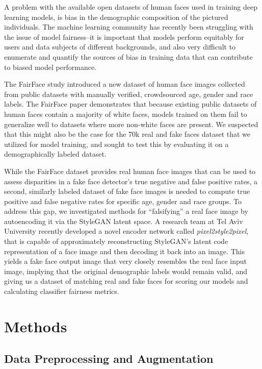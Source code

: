 \documentclass[11pt, letterpaper]{article}
\begin{document}
\begin{multicols}{2}
  A problem with the available open datasets of human faces used in
  training deep learning models, is bias in the demographic
  composition of the pictured individuals. The machine learning
  community has recently been struggling with the issue of model
  fairness--it is important that models perform equitably for users
  and data subjects of different backgrounds, and also very difficult
  to enumerate and quantify the sources of bias in training data that
  can contribute to biased model performance.

  The FairFace\cite{karkkainen2019fairface} study introduced a new
  dataset of human face images collected from public datasets with
  manually verified, crowdsourced age, gender and race labels. The
  FairFace paper demonstrates that because existing public datasets of
  human faces contain a majority of white faces, models trained on
  them fail to generalize well to datasets where more non-white faces
  are present. We suspected that this might also be the case for the
  70k real and fake faces dataset that we utilized for model training,
  and sought to test this by evaluating it on a demographically
  labeled dataset.

  While the FairFace dataset provides real human face images that can
  be used to assess disparities in a fake face detector's true
  negative and false positive rates, a second, similarly labeled
  dataset of fake face images is needed to compute true positive and
  false negative rates for specific age, gender and race groups. To
  address this gap, we investigated methods for ``falsifying'' a real
  face image by autoencoding it via the StyleGAN latent space. A
  research team at Tel Aviv University recently developed a novel
  encoder network\cite{richardson2020encoding} called
  \emph{pixel2style2pixel}, that is capable of approximately
  reconstructing StyleGAN's latent code representation of a face image
  and then decoding it back into an image. This yields a fake face
  output image that very closely resembles the real face input image,
  implying that the original demographic labels would remain valid,
  and giving us a dataset of matching real and fake faces for
  scoring our models and calculating classifier fairness metrics.

  \section{Methods}

  \subsection{Data Preprocessing and Augmentation}


\end{multicols}
\end{document}
